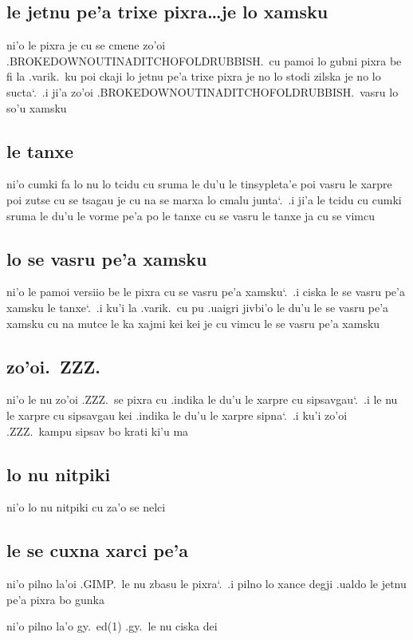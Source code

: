 \documentclass{report}
\newcommand\sds{\spacefactor\sfcode`.\ \space}
\begin{document}
\subsection{le jetnu pe'a trixe pixra\ldots je lo xamsku}
ni'o le pixra je cu se cmene zo'oi .BROKEDOWNOUTINADITCHOFOLDRUBBISH.\ cu pamoi lo gubni pixra be fi la .varik.\ ku poi ckaji lo jetnu pe'a trixe pixra je no lo stodi zilska je no lo sucta\sds  .i ji'a zo'oi .BROKEDOWNOUTINADITCHOFOLDRUBBISH.\ vasru lo so'u xamsku

\subsection{le tanxe}
ni'o cumki fa lo nu lo tcidu cu sruma le du'u le tinsypleta'e poi vasru le xarpre poi zutse cu se tsagau je cu na se marxa lo cmalu junta\sds  .i ji'a le tcidu cu cumki sruma le du'u le vorme pe'a po le tanxe cu se vasru le tanxe ja cu se vimcu

\subsection{lo se vasru pe'a xamsku}
ni'o le pamoi versiio be le pixra cu se vasru pe'a xamsku\sds  .i ciska le se vasru pe'a xamsku le tanxe\sds  .i ku'i la .varik.\ cu pu .uaigri jivbi'o le du'u le se vasru pe'a xamsku cu na mutce le ka xajmi kei kei je cu vimcu le se vasru pe'a xamsku

\subsection{zo'oi.\ ZZZ.}
ni'o le nu zo'oi .ZZZ.\ se pixra cu .indika le du'u le xarpre cu sipsavgau\sds  .i le nu le xarpre cu sipsavgau kei .indika le du'u le xarpre sipna\sds  .i ku'i zo'oi .ZZZ.\ kampu sipsav bo krati ki'u ma

\subsection{lo nu nitpiki}
ni'o lo nu nitpiki cu za'o se nelci

\subsection{le se cuxna xarci pe'a}
ni'o pilno la'oi .GIMP.\ le nu zbasu le pixra\sds  .i pilno lo xance degji .ualdo le jetnu pe'a pixra bo gunka

ni'o pilno la'o gy.\ ed(1) .gy.\ le nu ciska dei
\end{document}
